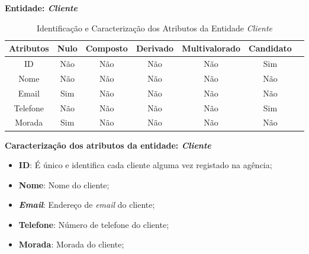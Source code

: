 \documentclass[a4paper,12pt]{scrreprt}
\newcommand{\Nao}{%
    \cellcolor{red!40}Não
}
\newcommand{\Sim}{%
    \cellcolor{green!40}Sim
}
\begin{document}
        \textbf{Entidade: \textit{Cliente}}
        \begin{table}[!ht]
        \centering
        \begin{tabular}{|c|c|c|c|c|c|c|}
        \hline
        \rowcolor{gray!20!white}
        \textbf{Atributos} & \textbf{Nulo} & \textbf{Composto} & \textbf{Derivado} & \textbf{Multivalorado} & \textbf{Candidato} \\
        \hline
        ID                  & \Nao & \Nao & \Nao & \Nao & \Sim \\
        Nome                & \Nao & \Nao & \Nao & \Nao & \Nao \\  
        Email               & \Sim & \Nao & \Nao & \Nao & \Nao \\
        Telefone            & \Nao & \Nao & \Nao & \Nao & \Sim \\
        Morada              & \Sim & \Nao & \Nao & \Nao & \Nao \\
        \hline
        \end{tabular}
        \caption{Identificação e Caracterização dos Atributos da Entidade \textit{Cliente}}
        \end{table}

        \textbf{Caracterização dos atributos da entidade: \textit{Cliente}}
        \begin{itemize}
            \item \textbf{ID}: É único e identifica cada cliente alguma vez registado na agência;
            \item \textbf{Nome}: Nome do cliente;
            \item \textbf{\textit{Email}}: Endereço de \textit{email} do cliente; 
            \item \textbf{Telefone}: Número de telefone do cliente;
            \item \textbf{Morada}: Morada do cliente;
        \end{itemize}


        \clearpage
\end{document}
